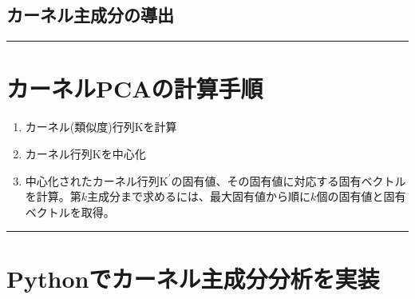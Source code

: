 \documentclass[11pt]{article}
\providecommand{\tightlist}{%
      \setlength{\itemsep}{0pt}\setlength{\parskip}{0pt}}
\begin{document}
    \subsection{カーネル主成分の導出}\label{ux30abux30fcux30cdux30ebux4e3bux6210ux5206ux306eux5c0eux51fa}

     

    \begin{center}\rule{0.5\linewidth}{\linethickness}\end{center}

\section{カーネルPCAの計算手順}\label{ux30abux30fcux30cdux30ebpcaux306eux8a08ux7b97ux624bux9806}

\begin{enumerate}
\def\labelenumi{\arabic{enumi}.}
\tightlist
\item
  カーネル(類似度)行列\(\boldsymbol {\mathrm {K}}\)を計算
\item
  カーネル行列\(\boldsymbol {\mathrm {K}}\)を中心化
\item
  中心化されたカーネル行列\(\boldsymbol {\mathrm {K}}^{\prime}\)の固有値、その固有値に対応する固有ベクトルを計算。第\(k\)主成分まで求めるには、最大固有値から順に\(k\)個の固有値と固有ベクトルを取得。
\end{enumerate}

    \begin{center}\rule{0.5\linewidth}{\linethickness}\end{center}

\section{Pythonでカーネル主成分分析を実装}\label{pythonux3067ux30abux30fcux30cdux30ebux4e3bux6210ux5206ux5206ux6790ux3092ux5b9fux88c5}
\end{document}

